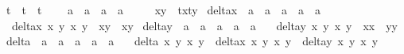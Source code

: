\begin{isabellebody}
\isanewline
{}\isamarkupfalse%
\ t\ \ {\isachardoublequoteopen}t\ {\isacharequal}\ t{\isacharprime}{\isachardoublequoteclose}\ \isanewline
\isanewline
{}\isamarkupfalse%
\ {\isasymtau}\ {\isacharcolon}{\isacharcolon}\ {\isachardoublequoteopen}{\isacharprime}a\ {\isasymtimes}\ {\isacharprime}a\ {\isasymRightarrow}\ {\isacharprime}a\ {\isasymtimes}\ {\isacharprime}a{\isachardoublequoteclose}\ \ \isanewline
\ \ {\isachardoublequoteopen}{\isasymtau}\ {\isacharparenleft}x{\isacharcomma}y{\isacharparenright}\ {\isacharequal}\ {\isacharparenleft}{}{\isacharslash}{\isacharparenleft}t{\isacharasterisk}x{\isacharparenright}{\isacharcomma}{}{\isacharslash}{\isacharparenleft}t{\isacharasterisk}y{\isacharparenright}{\isacharparenright}{\isachardoublequoteclose}\isanewline
\isanewline
\isanewline
\isanewline
\isanewline
{}\isamarkupfalse%
\ delta{\isacharunderscore}x\ {\isacharcolon}{\isacharcolon}\ {\isachardoublequoteopen}{\isacharprime}a\ {\isasymRightarrow}\ {\isacharprime}a\ {\isasymRightarrow}\ {\isacharprime}a\ {\isasymRightarrow}\ {\isacharprime}a\ {\isasymRightarrow}\ {\isacharprime}a{\isachardoublequoteclose}\ \isanewline
\ \ {\isachardoublequoteopen}delta{\isacharunderscore}x\ x{}\ y{}\ x{}\ y{}\ {\isacharequal}\ x{}{\isacharasterisk}y{}\ {\isacharminus}\ x{}{\isacharasterisk}y{}{\isachardoublequoteclose}\isanewline
{}\isamarkupfalse%
\ delta{\isacharunderscore}y\ {\isacharcolon}{\isacharcolon}\ {\isachardoublequoteopen}{\isacharprime}a\ {\isasymRightarrow}\ {\isacharprime}a\ {\isasymRightarrow}\ {\isacharprime}a\ {\isasymRightarrow}\ {\isacharprime}a\ {\isasymRightarrow}\ {\isacharprime}a{\isachardoublequoteclose}\ \isanewline
\ \ {\isachardoublequoteopen}delta{\isacharunderscore}y\ x{}\ y{}\ x{}\ y{}\ {\isacharequal}\ x{}{\isacharasterisk}x{}\ {\isacharplus}\ y{}{\isacharasterisk}y{}{\isachardoublequoteclose}\isanewline
{}\isamarkupfalse%
\ delta{\isacharprime}\ {\isacharcolon}{\isacharcolon}\ {\isachardoublequoteopen}{\isacharprime}a\ {\isasymRightarrow}\ {\isacharprime}a\ {\isasymRightarrow}\ {\isacharprime}a\ {\isasymRightarrow}\ {\isacharprime}a\ {\isasymRightarrow}\ {\isacharprime}a{\isachardoublequoteclose}\ \isanewline
\ \ {\isachardoublequoteopen}delta{\isacharprime}\ x{}\ y{}\ x{}\ y{}\ {\isacharequal}\ delta{\isacharunderscore}x\ x{}\ y{}\ x{}\ y{}\ {\isacharasterisk}\ delta{\isacharunderscore}y\ x{}\ y{}\ x{}\ y{}{\isachardoublequoteclose}\isanewline

\end{isabellebody}
